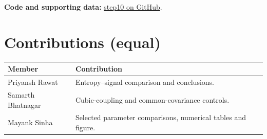 \documentclass[11pt,a4paper]{article}
\begin{document}
\textbf{Code and supporting data:} \href{https://github.com/rawatpriyansh17/QFT-PROJECT-GROUP-B/tree/main/step10}{step10 on GitHub}.\newpage\section*{Contributions (equal)}\begin{center}\begin{tabularx}{\linewidth}{p{33mm}X}\toprule Member & Contribution\\\midrule Priyansh Rawat & Entropy--signal comparison and conclusions.\\[3mm]Samarth Bhatnagar & Cubic-coupling and common-covariance controls.\\[3mm]Mayank Sinha & Selected parameter comparisons, numerical tables and figure.\\\bottomrule\end{tabularx}\end{center}
\end{document}
